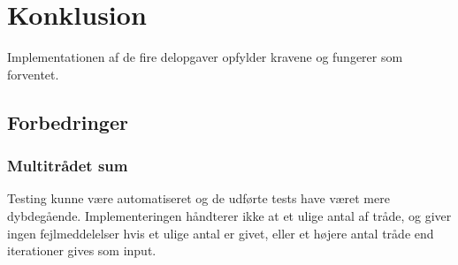 \section{Konklusion}
Implementationen af de fire delopgaver opfylder kravene og fungerer som forventet.


\subsection{Forbedringer}

\subsubsection{Multitrådet sum}
Testing kunne være automatiseret og de udførte tests have været mere dybdegående. Implementeringen håndterer ikke at et ulige antal af tråde, og giver ingen fejlmeddelelser hvis et ulige antal er givet, eller et højere antal tråde end iterationer gives som input.